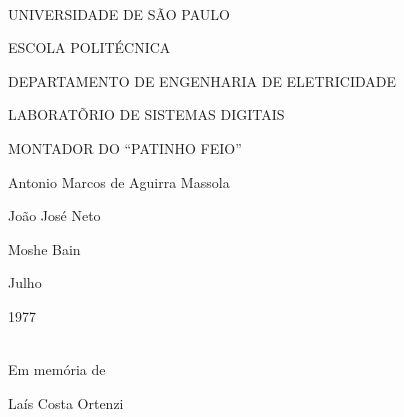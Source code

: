 \documentclass[a4paper,12pt]{article}
\begin{document}
\ttfamily

\noindent \\

\vspace{2em}
\hspace{5em} UNIVERSIDADE DE SÃO PAULO\par
\hspace{7em} ESCOLA POLITÉCNICA\par
\hspace{0.5em} DEPARTAMENTO DE ENGENHARIA DE ELETRICIDADE\par
\hspace{3em} LABORATÕRIO DE SISTEMAS DIGITAIS\par

\vspace{19em}
\hspace{4.5em} MONTADOR DO ``PATINHO FEIO''\par

\vspace{7em}
\hspace{7.5em} Antonio Marcos de Aguirra Massola\par
\hspace{7.5em} João José Neto\par
\hspace{7.5em} Moshe Bain\par

\vspace{7em}
\hspace{9.5em} Julho\par
\hspace{9.75em} 1977

\newpage

\noindent \\

\vspace{21em}
\hspace{6.5em} Em memória de\par
\hspace{6.5em} Laís Costa Ortenzi\par

\newpage

\setcounter{page}{1}

\renewcommand\contentsname{\ttfamily \hskip 13em \uline{INDICE}\\
\\
\uline{Assunto} \hskip 22.5em \uline{Página}\\[-0.5em]}

\tableofcontents
\end{document}
